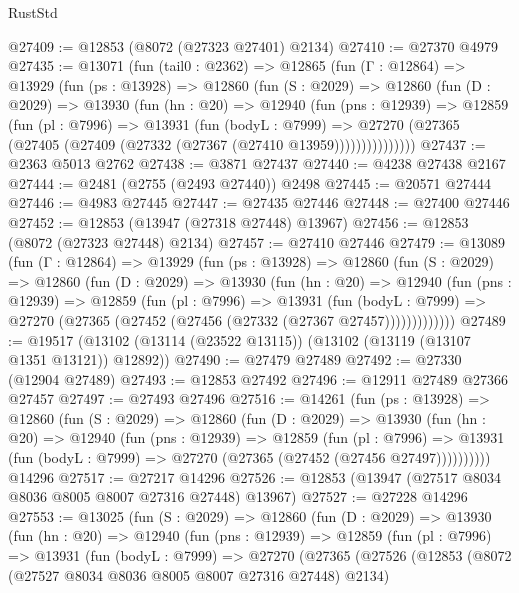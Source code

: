 \begin{lexlean}{RustStd}
\begin{coremodule}
@27409 := @12853 (@8072 (@27323 @27401) @2134)
@27410 := @27370 @4979
@27435 := @13071
    (fun (tail0 : @2362) =>
    @12865
      (fun (Γ : @12864) =>
      @13929
        (fun (ps : @13928) =>
        @12860
          (fun (S : @2029) =>
          @12860
            (fun (D : @2029) =>
            @13930
              (fun (hn : @20) =>
              @12940
                (fun (pns : @12939) =>
                @12859
                  (fun (pl : @7996) =>
                  @13931
                    (fun (bodyL : @7999) =>
                    @27270 (@27365 (@27405 (@27409 (@27332 (@27367 (@27410 @13959)))))))))))))))
@27437 := @2363 @5013 @2762
@27438 := @3871 @27437
@27440 := @4238 @27438 @2167
@27444 := @2481 (@2755 (@2493 @27440)) @2498
@27445 := @20571 @27444
@27446 := @4983 @27445
@27447 := @27435 @27446
@27448 := @27400 @27446
@27452 := @12853 (@13947 (@27318 @27448) @13967)
@27456 := @12853 (@8072 (@27323 @27448) @2134)
@27457 := @27410 @27446
@27479 := @13089
    (fun (Γ : @12864) =>
    @13929
      (fun (ps : @13928) =>
      @12860
        (fun (S : @2029) =>
        @12860
          (fun (D : @2029) =>
          @13930
            (fun (hn : @20) =>
            @12940
              (fun (pns : @12939) =>
              @12859
                (fun (pl : @7996) =>
                @13931
                  (fun (bodyL : @7999) =>
                  @27270 (@27365 (@27452 (@27456 (@27332 (@27367 @27457)))))))))))))
@27489 := @19517 (@13102 (@13114 (@23522 @13115)) (@13102 (@13119 (@13107 @1351 @13121)) @12892))
@27490 := @27479 @27489
@27492 := @27330 (@12904 @27489)
@27493 := @12853 @27492
@27496 := @12911 @27489 @27366 @27457
@27497 := @27493 @27496
@27516 := @14261
    (fun (ps : @13928) =>
    @12860
      (fun (S : @2029) =>
      @12860
        (fun (D : @2029) =>
        @13930
          (fun (hn : @20) =>
          @12940
            (fun (pns : @12939) =>
            @12859
              (fun (pl : @7996) =>
              @13931 (fun (bodyL : @7999) => @27270 (@27365 (@27452 (@27456 @27497))))))))))
    @14296
@27517 := @27217 @14296
@27526 := @12853 (@13947 (@27517 @8034 @8036 @8005 @8007 @27316 @27448) @13967)
@27527 := @27228 @14296
@27553 := @13025
    (fun (S : @2029) =>
    @12860
      (fun (D : @2029) =>
      @13930
        (fun (hn : @20) =>
        @12940
          (fun (pns : @12939) =>
          @12859
            (fun (pl : @7996) =>
            @13931
              (fun (bodyL : @7999) =>
              @27270
                (@27365
                  (@27526
                    (@12853
                      (@8072 (@27527 @8034 @8036 @8005 @8007 @27316 @27448) @2134)

\end{coremodule}
\end{lexlean}
